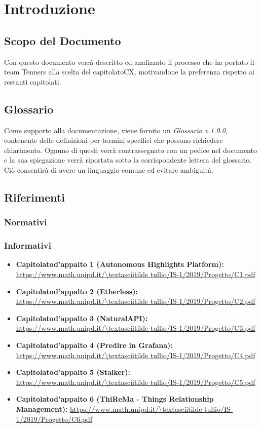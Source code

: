 \section{Introduzione}

\subsection{Scopo del Documento}
Con questo documento verrà descritto ed analizzato il processo che ha portato il team Tenners alla scelta del capitolato\glo CX, motivandone la preferenza rispetto ai restanti capitolati.
	
\subsection{Glossario}
Come supporto alla documentazione, viene fornito un \textit{Glossario v.1.0.0}, contenente delle definizioni per termini specifici che possono richiedere chiarimento. Ognuno di questi verrà contrassegnato con un pedice \glo nel documento e la sua spiegazione verrà riportata sotto la corrispondente lettera del glossario. Ciò consentirà di avere un linguaggio comune ed evitare ambiguità. 
	
\subsection{Riferimenti}
\subsubsection{Normativi}
\subsubsection{Informativi}
\begin{itemize}
    \item \textbf{Capitolato\glo d'appalto 1 (Autonomous Highlights Platform):}
    \url{https://www.math.unipd.it/\textasciitilde tullio/IS-1/2019/Progetto/C1.pdf}
    \item \textbf{Capitolato\glo d'appalto 2 (Etherless):} \url{https://www.math.unipd.it/\textasciitilde tullio/IS-1/2019/Progetto/C2.pdf}
    \item \textbf{Capitolato\glo d'appalto 3 (NaturalAPI):} \url{https://www.math.unipd.it/\textasciitilde tullio/IS-1/2019/Progetto/C3.pdf}
    \item \textbf{Capitolato\glo d'appalto 4 (Predire in Grafana):} \url{https://www.math.unipd.it/\textasciitilde tullio/IS-1/2019/Progetto/C4.pdf}
    \item \textbf{Capitolato\glo d'appalto 5 (Stalker):} 
    \url{https://www.math.unipd.it/\textasciitilde tullio/IS-1/2019/Progetto/C5.pdf}
    \item \textbf{Capitolato\glo d'appalto 6 (ThiReMa - Things Relationship Management):} \url{https://www.math.unipd.it/\textasciitilde tullio/IS-1/2019/Progetto/C6.pdf}
\end{itemize}

	
	

